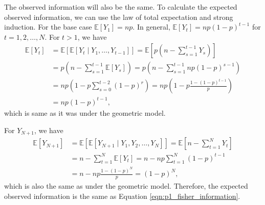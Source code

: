 \documentclass[letterpaper,11pt]{article}
\begin{document}
\begin{enumerate}
\begin{enumerate}
\begin{description}
        The observed information will also be the same. To calculate the
        expected observed information, we can use the law of total expectation
        and strong induction. For the base case
        $\mathbb{E}\left[Y_1\right] = np$. In general,
        $\mathbb{E}\left[Y_t\right] = np\left(1 - p\right)^{t-1}$ for
        $t = 1,2,\ldots,N$. For $t > 1$, we have
        \begin{align}
          \mathbb{E}\left[Y_t\right]
          &=  
            \mathbb{E}\left[\mathbb{E}\left[Y_t \mid Y_1,\ldots,Y_{t-1}\right]\right]
          =
            \mathbb{E}\left[
            p\left(n - \sum_{s=1}^{t-1}Y_s\right)
            \right] \nonumber\\
          &= p\left(n - \sum_{s=1}^{t-1}\mathbb{E}\left[Y_s\right]\right)
          =
            p\left(n - \sum_{s=1}^{t-1} np\left(1 - p\right)^{s-1}\right)
            \nonumber\\
          &= np\left(1 - p\sum_{s=0}^{t-2}\left(1 - p\right)^r\right)
            = np\left(
            1 - p\frac{1 - \left(1 - p\right)^{t - 1}}{p}\right)
          \nonumber\\
          &= np\left(1 - p\right)^{t-1},
            \label{eqn:p3_yt_mean}
        \end{align}
        which is same as it was under the geometric model.
        
        For $Y_{N+1}$, we have
        \begin{align}
          \mathbb{E}\left[Y_{N+1}\right]
          &= \mathbb{E}\left[
            \mathbb{E}\left[Y_{N+1} \mid Y_1,Y_2,\ldots,Y_N\right]\right]
          = \mathbb{E}\left[
          n - \sum_{t=1}^{N} Y_t
          \right]
          \nonumber\\
          &= n - \sum_{t=1}^{N} \mathbb{E}\left[Y_t\right]
            = n - np\sum_{t=1}^N\left(1 - p\right)^{t-1} \nonumber\\
          &= n - np \frac{1 - \left(1 - p\right)^N}{p} = \left(1 - p\right)^N,
            \label{eqn:p3_yn1_mean}
        \end{align}
        which is also the same as under the geometric model. Therefore, the
        expected observed information is the same as Equation
        \ref{eqn:p1_fisher_information}.


\end{description}
\end{enumerate}
\end{enumerate}
\end{document}
